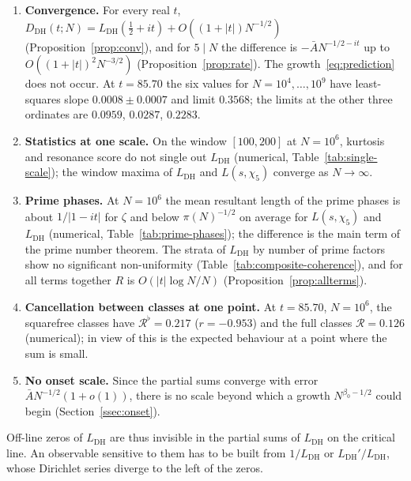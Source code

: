 \documentclass[11pt]{amsart}
\theoremstyle{definition}
\theoremstyle{remark}
\renewcommand{\DH}{\mathrm{DH}}
\newcommand{\abs}[1]{\lvert #1 \rvert}
\newcommand{\Abar}{\bar A}
\newcommand{\calR}{\mathcal{R}}
\begin{document}
\begin{enumerate}
\item \textbf{Convergence.}  For every real $t$,
  $D_{\DH}(t;N)=L_{\DH}(\tfrac12+it)+O((1+\abs t)N^{-1/2})$
  (Proposition~\ref{prop:conv}), and for $5\mid N$ the difference is
  $-\Abar N^{-1/2-it}$ up to $O((1+\abs t)^2N^{-3/2})$
  (Proposition~\ref{prop:rate}).  The growth~\eqref{eq:prediction} does not
  occur.  At $t=85.70$ the six values for $N=10^4,\dots,10^9$ have
  least-squares slope $0.0008\pm0.0007$ and limit $0.3568$; the limits at
  the other three ordinates are $0.0959$, $0.0287$, $0.2283$.

\item \textbf{Statistics at one scale.}  On the window $[100,200]$ at
  $N=10^6$, kurtosis and resonance score do not single out $L_{\DH}$
  (numerical, Table~\ref{tab:single-scale}); the window maxima of
  $L_{\DH}$ and $L(s,\chi_5)$ converge as $N\to\infty$.

\item \textbf{Prime phases.}  At $N=10^6$ the mean resultant length of the
  prime phases is about $1/\abs{1-it}$ for $\zeta$ and below
  $\pi(N)^{-1/2}$ on average for $L(s,\chi_5)$ and $L_{\DH}$ (numerical,
  Table~\ref{tab:prime-phases}); the difference is the main term of the
  prime number theorem.  The strata of $L_{\DH}$ by number of prime
  factors show no significant non-uniformity
  (Table~\ref{tab:composite-coherence}), and for all terms together $R$
  is $O(\abs t\log N/N)$ (Proposition~\ref{prop:allterms}).

\item \textbf{Cancellation between classes at one point.}  At $t=85.70$,
  $N=10^6$, the squarefree classes have $\calR^\flat=0.217$
  ($r=-0.953$) and the full classes $\calR=0.126$ (numerical); in view
  of \cite{TrejoSignNote} this is the expected behaviour at a point where
  the sum is small.

\item \textbf{No onset scale.}  Since the partial sums converge with
  error $\Abar N^{-1/2}(1+o(1))$, there is no scale beyond which a growth
  $N^{\beta_0-1/2}$ could begin (Section~\ref{ssec:onset}).
\end{enumerate}

Off-line zeros of $L_{\DH}$ are thus invisible in the partial sums of
$L_{\DH}$ on the critical line.  An observable sensitive to them has to be
built from $1/L_{\DH}$ or $L_{\DH}'/L_{\DH}$, whose Dirichlet series
diverge to the left of the zeros.
\end{document}
